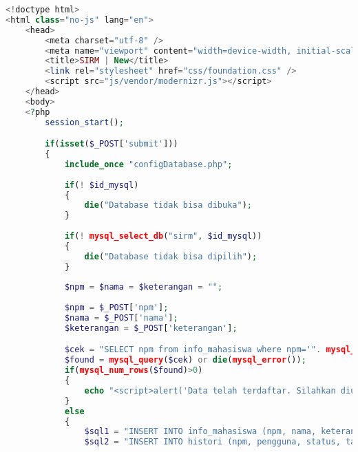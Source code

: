\begin{lstlisting}[language=php,basicstyle=\tiny,caption=new.php]
<!doctype html>
<html class="no-js" lang="en">
	<head>
		<meta charset="utf-8" />
		<meta name="viewport" content="width=device-width, initial-scale=1.0" />
		<title>SIRM | New</title>
		<link rel="stylesheet" href="css/foundation.css" />
		<script src="js/vendor/modernizr.js"></script>
	</head>
	<body>
	<?php
		session_start();

		if(isset($_POST['submit']))
		{
			include_once "configDatabase.php";
				
			if(! $id_mysql)
			{
				die("Database tidak bisa dibuka");
			}
				
			if(! mysql_select_db("sirm", $id_mysql))
			{
				die("Database tidak bisa dipilih");
			}
			
			$npm = $nama = $keterangan = "";
			
			$npm = $_POST['npm'];
			$nama = $_POST['nama'];
			$keterangan = $_POST['keterangan']; 

			$cek = "SELECT npm from info_mahasiswa where npm='". mysql_real_escape_string($npm)  ."'";
			$found = mysql_query($cek) or die(mysql_error());
			if(mysql_num_rows($found)>0)
			{
				echo "<script>alert('Data telah terdaftar. Silahkan diulangi dengan data yang lain.');window.location.href='new.php';</script>";
			}
			else
			{
				$sql1 = "INSERT INTO info_mahasiswa (npm, nama, keterangan) VALUES ('". mysql_real_escape_string($npm)  ."', '". mysql_real_escape_string($nama)  ."', '". mysql_real_escape_string($keterangan)  ."')";
				$sql2 = "INSERT INTO histori (npm, pengguna, status, tanggal_pembaruan, keterangan) VALUES ('". mysql_real_escape_string($npm)  ."', '".$_SESSION['email']."', 'membuat entri', now(), '". mysql_real_escape_string($keterangan)  ."')";
				

\end{lstlisting}
